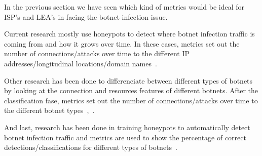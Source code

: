 

In the previous section we have seen which kind of metrics would be ideal for ISP's and LEA's in facing the botnet infection issue. 

Current research mostly use honeypots to detect where botnet infection traffic is coming from and how it grows over time. In these cases, metrics set out the number of connections/attacks over time to the different IP addresses/longitudinal locations/domain names~\cite{AM2006}.

Other research has been done to differenciate between different types of botnets by looking at the connection and resources features of different botnets. After the classification fase, metrics set out the number of connections/attacks over time to the different botnet types~\cite{GJ2007},~\cite{AM2005}.

And last, research has been done in training honeypots to automatically detect botnet infection traffic and metrics are used to show the percentage of correct detections/classifications for different types of botnets~\cite{haltas2014automated}.
